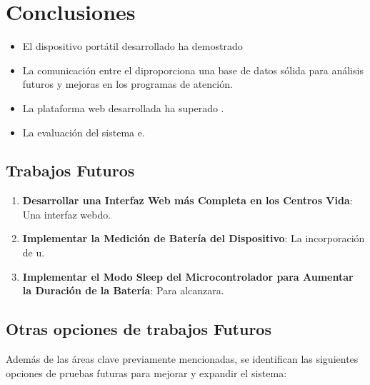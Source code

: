 \newpage
\section{Conclusiones}

\begin{itemize}
    \item El dispositivo portátil desarrollado ha demostrado 
    
    \item La comunicación entre el diproporciona una base de datos sólida para análisis futuros y mejoras en los programas de atención.
    
    \item La plataforma web desarrollada ha superado .
    
    \item La evaluación del sistema e.

\end{itemize}
\subsection{Trabajos Futuros}

\begin{enumerate}
    \item \textbf{Desarrollar una Interfaz Web más Completa en los Centros Vida}:
    Una interfaz webdo.

    \item \textbf{Implementar la Medición de Batería del Dispositivo}:
    La incorporación de u.

    \item \textbf{Implementar el Modo Sleep del Microcontrolador para Aumentar la Duración de la Batería}:
    Para alcanzara.
\end{enumerate}

\subsection{Otras opciones de trabajos Futuros}

Además de las áreas clave previamente mencionadas, se identifican las siguientes opciones de pruebas futuras para mejorar y expandir el sistema:

